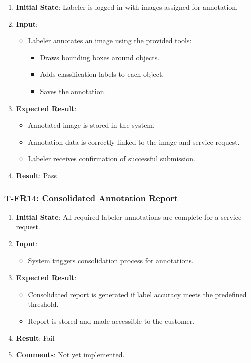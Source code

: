 \documentclass[12pt, titlepage]{article}
\begin{document}
\begin{enumerate}
    \item \textbf{Initial State}: Labeler is logged in with images assigned for annotation.
    \item \textbf{Input}:
    \begin{itemize}
        \item Labeler annotates an image using the provided tools:
        \begin{itemize}
            \item Draws bounding boxes around objects.
            \item Adds classification labels to each object.
            \item Saves the annotation.
        \end{itemize}
    \end{itemize}

        \item \textbf{Expected Result}:
        \begin{itemize}
            \item Annotated image is stored in the system.
            \item Annotation data is correctly linked to the image and service request.
            \item Labeler receives confirmation of successful submission.
        \end{itemize}
        \item \textbf{Result}: Pass
\end{enumerate}

\subsubsection*{T-FR14: Consolidated Annotation Report}

\begin{enumerate}
    \item \textbf{Initial State}: All required labeler annotations are complete for a service request.
    \item \textbf{Input}:
    \begin{itemize}
        \item System triggers consolidation process for annotations.
    \end{itemize}
        \item \textbf{Expected Result}:
        \begin{itemize}
            \item Consolidated report is generated if label accuracy meets the predefined threshold.
            \item Report is stored and made accessible to the customer.
        \end{itemize}
        \item \textbf{Result}: Fail
        \item \textbf{Comments}: Not yet implemented.
\end{enumerate}
\end{document}
